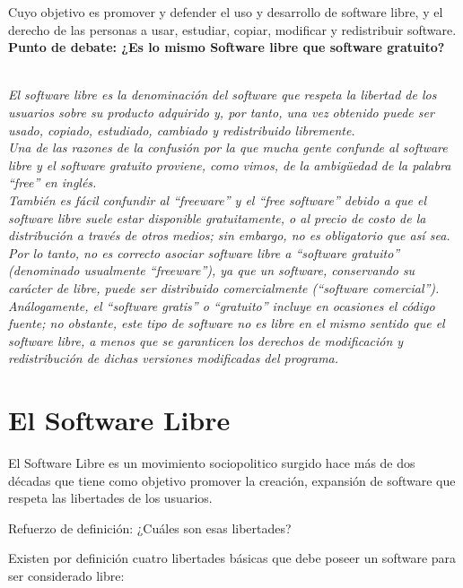Cuyo objetivo es promover y defender el uso y desarrollo de software libre, y el derecho de las personas a usar, estudiar, copiar, modificar y redistribuir software.
\\
{\bf Punto de debate: ¿Es lo mismo Software libre que software gratuito?}
{\it 
\\
El software libre es la denominación del software que respeta la libertad de los usuarios sobre su producto adquirido y, por tanto, una vez obtenido puede ser usado, copiado, estudiado, cambiado y redistribuido libremente.
\\
Una de las razones de la confusión por la que mucha gente confunde al software libre y el software gratuito proviene, como vimos, de la ambigüedad de la palabra “free” en inglés.
\\
También es fácil confundir al “freeware” y el “free software” debido a que el software libre suele estar disponible gratuitamente, o al precio de costo de la distribución a través de otros medios; sin embargo, no es obligatorio que así sea. Por lo tanto, no es correcto asociar software libre a “software gratuito” (denominado usualmente “freeware”), ya que un software, conservando su carácter de libre, puede ser distribuido comercialmente (“software comercial”). Análogamente, el “software gratis” o “gratuito” incluye en ocasiones el código fuente; no obstante, este tipo de software no es libre en el mismo sentido que el software libre, a menos que se garanticen los derechos de modificación y redistribución de dichas versiones modificadas del programa.

}


\section{ El Software Libre}

El Software Libre es un movimiento sociopolitico surgido hace más de dos décadas que tiene como objetivo promover la creación, expansión de software que respeta las libertades de los usuarios.

Refuerzo de definición: ¿Cuáles son esas libertades?

Existen por definición cuatro libertades básicas que debe poseer un software para ser considerado libre:

